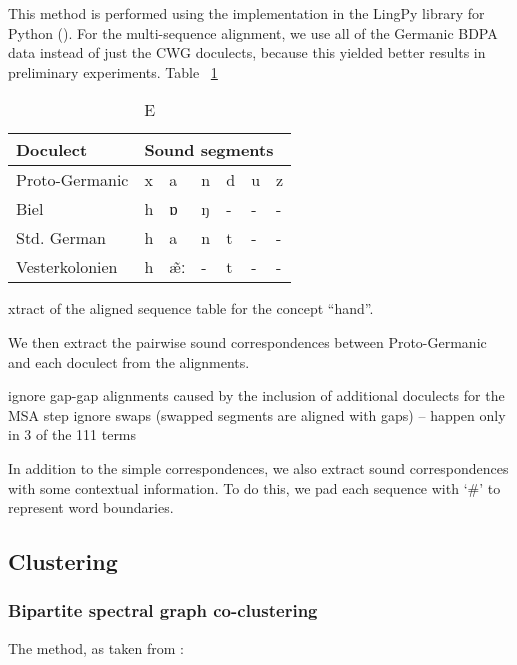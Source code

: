 \documentclass{article}
\begin{document}
This method is performed using the implementation in the LingPy library for Python (\cite{list2018lingpy}).
For the multi-sequence alignment, we use all of the Germanic BDPA data instead of just the CWG doculects, because this yielded better results in preliminary experiments. %
Table ~\ref{tab:msa}

\begin{table}[]
\begin{center}
\begin{tabular}{l|llllll}
Doculect       & \multicolumn{6}{l}{Sound segments} \\ \hline
Proto-Germanic & x   & a     & n   & d   & u   & z  \\
Biel           & h   & ɒ     & ŋ   & -   & -   & -  \\
Std. German    & h   & a     & n   & t   & -   & -  \\
Vesterkolonien & h   & æ̃ː    & -   & t   & -   & - 
\end{tabular}
\end{center}
\label{tab:msa}
\caption Extract of the aligned sequence table for the concept ``hand''.
\end{table}

We then extract the pairwise sound correspondences between Proto-Germanic and each doculect from the alignments.

ignore gap-gap alignments caused by the inclusion of additional doculects for the MSA step
ignore swaps (swapped segments are aligned with gaps) -- happen only in 3 of the 111 terms

In addition to the simple correspondences, we also extract sound correspondences with some contextual information.
To do this, we pad each sequence with `#' to represent word boundaries.


\subsection{Clustering}

\subsubsection{Bipartite spectral graph co-clustering}

The method, as taken from \cite{dhillon2001co-clustering}:
\end{document}

